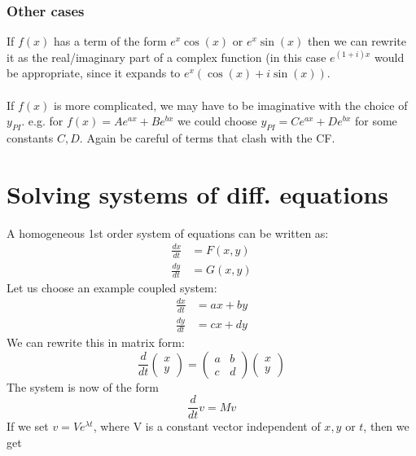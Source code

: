 \documentclass{scrartcl}
\begin{document}
\subsubsection*{Other cases}
If $ f(x) $ has a term of the form $ e^{x}\cos(x) $ or $ e^{x}\sin(x) $ then we can rewrite it as the real/imaginary part of a complex function (in this case $ e^{(1+i)x} $ would be appropriate, since it expands to $ e^{x}(\cos(x) + i\sin(x)) $.
\\\\
If $ f(x) $ is more complicated, we may have to be imaginative with the choice of $ y_{PI} $. e.g. for $ f(x) = Ae^{ax} + Be^{bx} $ we could choose $ y_{PI} = Ce^{ax} + De^{bx} $ for some constants $ C, D $. Again be careful of terms that clash with the CF.

\section{Solving systems of diff. equations}
A homogeneous 1st order system of equations can be written as:
\begin{equation}
\begin{split}
\frac{dx}{dt} & = F(x, y) \\
\frac{dy}{dt} & = G(x, y)
\end{split}
\end{equation}
Let us choose an example coupled system:
\begin{equation}
\begin{split}
\frac{dx}{dt} & = ax + by \\
\frac{dy}{dt} & = cx + dy
\end{split}
\end{equation}
We can rewrite this in matrix form:
\begin{equation}
\frac{d}{dt}
\begin{pmatrix}
x \\
y
\end{pmatrix}
=
\begin{pmatrix}
a & b \\
c & d
\end{pmatrix}
\begin{pmatrix}
x \\
y
\end{pmatrix}
\end{equation}
The system is now of the form
\begin{equation}
\frac{d}{dt}v = Mv
\end{equation}
If we set $ v = Ve^{\lambda  t} $, where V is a constant vector independent of $ x, y $ or $ t $, then we get
\end{document}
